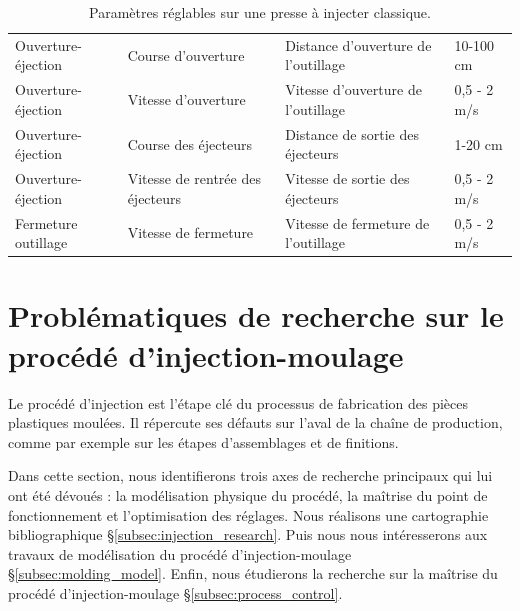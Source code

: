 \begin{table}[thbp]
\begin{tabular}{|llll|}
		Ouverture-éjection     & Course d'ouverture               & Distance d'ouverture de l'outillage                                       & 10-100 cm                      \\
		Ouverture-éjection     & Vitesse d'ouverture              & Vitesse d'ouverture de l'outillage                                        & 0,5 - 2 m/s                    \\
		Ouverture-éjection     & Course des éjecteurs             & Distance de sortie des éjecteurs                                      & 1-20 cm                        \\
		Ouverture-éjection     & Vitesse de rentrée des éjecteurs & Vitesse de sortie des éjecteurs                                                               & 0,5 - 2 m/s                    \\
		Fermeture outillage      & Vitesse de fermeture             & Vitesse de fermeture de l'outillage                                                           & 0,5 - 2 m/s                   \\
		\hline
	\end{tabular}%
	\caption{Paramètres réglables sur une presse à injecter classique.}
	\label{tab:process_parameters}
\end{table}


\section{Problématiques de recherche sur le procédé d'injection-moulage}  \label{sec:research_topics}
Le procédé d'injection est l'étape clé du processus de fabrication des pièces plastiques moulées.
Il répercute ses défauts sur l'aval de la chaîne de production, comme par exemple sur les étapes d'assemblages et de finitions.

Dans cette section, nous identifierons trois axes de recherche principaux qui lui ont été dévoués : la modélisation physique du procédé, la maîtrise du point de fonctionnement et l'optimisation des réglages.
Nous réalisons une cartographie bibliographique §\ref{subsec:injection_research}.
Puis nous nous intéresserons aux travaux de modélisation du procédé d'injection-moulage §\ref{subsec:molding_model}.
Enfin, nous étudierons la recherche sur la maîtrise du procédé d'injection-moulage §\ref{subsec:process_control}.

